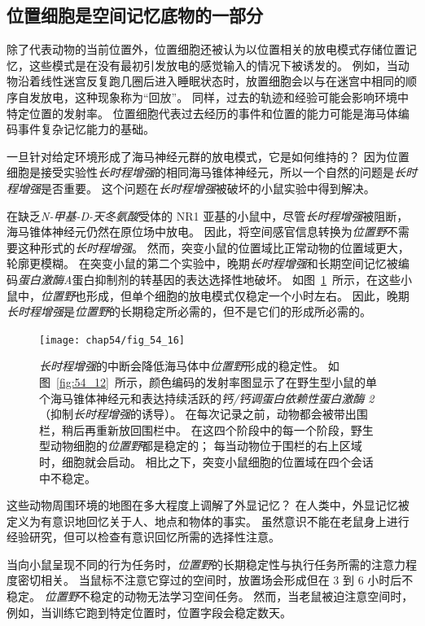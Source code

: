 \subsection{位置细胞是空间记忆底物的一部分}

除了代表动物的当前位置外，位置细胞还被认为以位置相关的放电模式存储位置记忆，这些模式是在没有最初引发放电的感觉输入的情况下被诱发的。
例如，当动物沿着线性迷宫反复跑几圈后进入睡眠状态时，放置细胞会以与在迷宫中相同的顺序自发放电，这种现象称为“回放”。
同样，过去的轨迹和经验可能会影响环境中特定位置的发射率。
位置细胞代表过去经历的事件和位置的能力可能是海马体编码事件复杂记忆能力的基础。


一旦针对给定环境形成了海马神经元群的放电模式，它是如何维持的？
因为位置细胞是接受实验性\textit{长时程增强}的相同海马锥体神经元，所以一个自然的问题是\textit{长时程增强}是否重要。
这个问题在\textit{长时程增强}被破坏的小鼠实验中得到解决。


在缺乏\textit{N-甲基-D-天冬氨酸}受体的 NR1 亚基的小鼠中，尽管\textit{长时程增强}被阻断，海马锥体神经元仍然在原位场中放电。
因此，将空间感官信息转换为\textit{位置野}不需要这种形式的\textit{长时程增强}。
然而，突变小鼠的位置域比正常动物的位置域更大，轮廓更模糊。
在突变小鼠的第二个实验中，晚期\textit{长时程增强}和长期空间记忆被编码\textit{蛋白激酶A}蛋白抑制剂的转基因的表达选择性地破坏。
如图~\ref{fig:54_16}~所示，在这些小鼠中，\textit{位置野}也形成，但单个细胞的放电模式仅稳定一个小时左右。
因此，晚期\textit{长时程增强}是\textit{位置野}的长期稳定所必需的，但不是它们的形成所必需的。


\begin{figure}[htbp]
	\centering
	\texttt{[image: chap54/fig\_54\_16]}
	\caption{\textit{长时程增强}的中断会降低海马体中\textit{位置野}形成的稳定性。
		如图~\ref{fig:54_12}~所示，颜色编码的发射率图显示了在野生型小鼠的单个海马锥体神经元和表达持续活跃的\textit{钙/钙调蛋白依赖性蛋白激酶 2}（抑制\textit{长时程增强}的诱导）。
		在每次记录之前，动物都会被带出围栏，稍后再重新放回围栏中。
		在这四个阶段中的每一个阶段，野生型动物细胞的\textit{位置野}都是稳定的；
		每当动物位于围栏的右上区域时，细胞就会启动。
		相比之下，突变小鼠细胞的位置域在四个会话中不稳定\cite{rotenberg1996mice}。}
	\label{fig:54_16}
\end{figure}


这些动物周围环境的地图在多大程度上调解了外显记忆？
在人类中，外显记忆被定义为有意识地回忆关于人、地点和物体的事实。
虽然意识不能在老鼠身上进行经验研究，但可以检查有意识回忆所需的选择性注意。


当向小鼠呈现不同的行为任务时，\textit{位置野}的长期稳定性与执行任务所需的注意力程度密切相关。
当鼠标不注意它穿过的空间时，放置场会形成但在 3 到 6 小时后不稳定。
\textit{位置野}不稳定的动物无法学习空间任务。
然而，当老鼠被迫注意空间时，例如，当训练它跑到特定位置时，位置字段会稳定数天。


